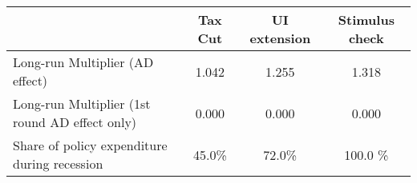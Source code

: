 \begin{tabular}{@{}lccc@{}}
\toprule
& Tax Cut    & UI extension    & Stimulus check    \\  \midrule
Long-run Multiplier (AD effect) &1.042  & 1.255  & 1.318     \\
Long-run Multiplier (1st round AD effect only) &0.000  & 0.000  & 0.000     \\
Share of policy expenditure during recession &45.0\%  & 72.0\%  & 100.0 \%    \\
\end{tabular}
